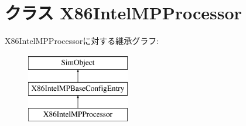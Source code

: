 \hypertarget{classIntelMP_1_1X86IntelMPProcessor}{
\section{クラス X86IntelMPProcessor}
\label{classIntelMP_1_1X86IntelMPProcessor}
}
X86IntelMPProcessorに対する継承グラフ:\begin{figure}[H]
\begin{center}
\leavevmode
\includegraphics[height=3cm]{classIntelMP_1_1X86IntelMPProcessor}
\end{center}
\end{figure}

